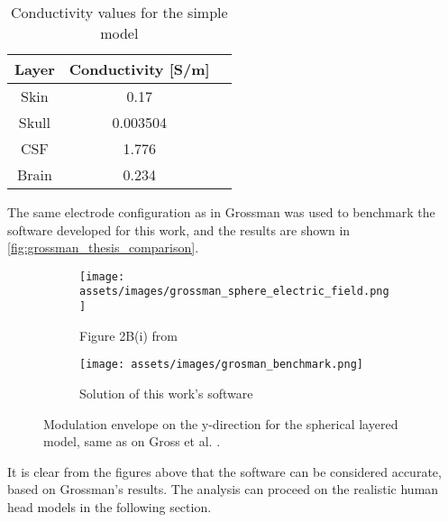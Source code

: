 \begin{table}[!ht]
\centering
\caption{Conductivity values for the simple model \cite{ITstissue}}
\label{tab:grossman_conductivity_vals}
\begin{tabular}{|c|c|c|}
    \hline
    \rowcolor[HTML]{C0C0C0} 
    {\color[HTML]{000000} \textbf{Layer}} & {\color[HTML]{000000} \textbf{Conductivity {[}S/m{]}}} \\ \hline
    Skin & 0.17 \\ \hline
    Skull & 0.003504 \\ \hline
    CSF & 1.776 \\ \hline
    Brain & 0.234 \\ \hline
\end{tabular}
\end{table}

The same electrode configuration as in Grossman \cite{Grossman2017} was used to benchmark the software developed for this work, and the results are shown in \autoref{fig:grossman_thesis_comparison}.
\begin{figure}[H]
    \centering
    \begin{subfigure}[b]{0.49\textwidth}
        \centering
        \texttt{[image: assets/images/grossman\_sphere\_electric\_field.png]}
        \caption{Figure 2B(i) from }
        \label{fig:grossman_envelope}
    \end{subfigure}
    \begin{subfigure}[b]{0.49\textwidth}
        \centering
        \texttt{[image: assets/images/grosman\_benchmark.png]}
        \caption{Solution of this work's software}
        \label{fig:envelope_at_y_benchmark}
    \end{subfigure}
    \caption[Modulation envelope on the y-direction for the spherical layered model]{Modulation envelope on the y-direction for the spherical layered model, same as on Gross et al. \cite[Figure 2B]{Grossman2017}.}
    \label{fig:grossman_thesis_comparison}
\end{figure}

It is clear from the figures above that the software can be considered accurate, based on Grossman's results. The analysis can proceed on the realistic human head models in the following section.

